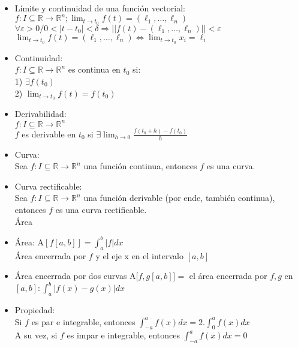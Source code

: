 \documentclass[a4paper, 12pt]{article}
\begin{document}
\begin{itemize}
\item Límite y continuidad de una función vectorial:\\
$f: I\subseteq \mathbb{R} \to \mathbb{R}^n ; \displaystyle \lim_{t \to t_0} f(t) = (\ell_1, \dots, \ell_n)$\\
$\forall \varepsilon > 0 / 0 < |t - t_0|<\delta \Rightarrow ||f(t) - (\ell_1, \dots, \ell_n)|| < \varepsilon$\\
$\displaystyle \lim_{t \to t_0} f(t)=(\ell_1,\dots,\ell_n) \Longleftrightarrow \lim_{t \to t_0} x_i = \ell_i$ \\
\item Continuidad: \\
$f: I\subseteq \mathbb{R} \to \mathbb{R}^n$ es continua en $t_0$ si:\\
1) $\exists f(t_0)$\\
2) $\displaystyle \lim_{t \to t_0} f(t)=f(t_0)$\\
\item Derivabilidad:\\
$f: I \subseteq \mathbb{R} \to \mathbb{R}^n$ \\
$f$ es derivable en $t_0$ si $\displaystyle \exists \lim_{h \to 0} \frac{f(t_0 + h) - f(t_0)}{h}$
\item Curva: \\
Sea $f: I\subseteq \mathbb{R} \to \mathbb{R}^n$ una función continua, entonces $f$ es una curva.\\
\item Curva rectificable:\\
Sea $f: I\subseteq \mathbb{R} \to \mathbb{R}^n$ una función derivable (por ende, también continua), entonces $f$ es una curva rectificable.\\
\newpage
Área

\item Área: A$[f[a,b]] = \displaystyle \int_a^b |f|dx$\\
Área encerrada por $f$ y el eje x en el intervalo $[a,b]$\\

\item Área encerrada por dos curvas A[$f,g[a,b]]=$ el área encerrada por $f,g$ en $[a,b]: \displaystyle \int_a^b |f(x) - g(x)|dx$

\item Propiedad: \\
Si $f$ es par e integrable, entonces $\displaystyle \int_{-a}^a f(x) dx = 2.\int_0^a f(x) dx$ \\
A su vez, si $f$ es impar e integrable, entonces $\displaystyle \int_{-a}^a f(x) dx = 0 $\\


\end{itemize}
\end{document}
